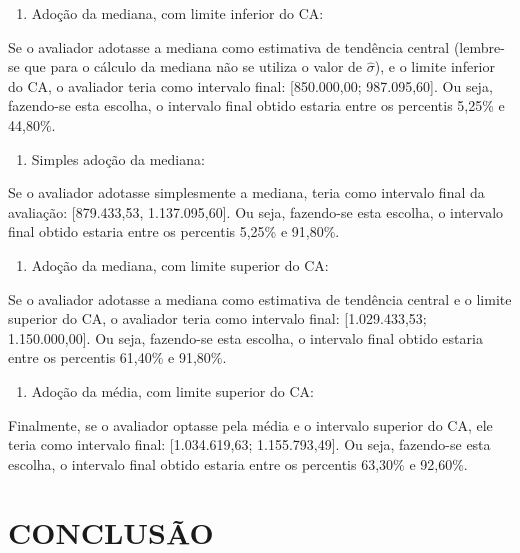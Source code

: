 \documentclass[a4paper, 12pt]{article}
\providecommand{\tightlist}{%
  \setlength{\itemsep}{0pt}\setlength{\parskip}{0pt}}
\begin{document}
\begin{enumerate}
\def\labelenumi{\arabic{enumi}.}
\setcounter{enumi}{1}
\tightlist
\item
  Adoção da mediana, com limite inferior do CA:
\end{enumerate}

Se o avaliador adotasse a mediana como estimativa de tendência central
(lembre-se que para o cálculo da mediana não se utiliza o valor de
\(\hat \sigma\)), e o limite inferior do CA, o avaliador teria como
intervalo final: {[}850.000,00; 987.095,60{]}. Ou seja, fazendo-se esta
escolha, o intervalo final obtido estaria entre os percentis 5,25\% e
44,80\%.

\begin{enumerate}
\def\labelenumi{\arabic{enumi}.}
\setcounter{enumi}{2}
\tightlist
\item
  Simples adoção da mediana:
\end{enumerate}

Se o avaliador adotasse simplesmente a mediana, teria como intervalo
final da avaliação: {[}879.433,53, 1.137.095,60{]}. Ou seja, fazendo-se
esta escolha, o intervalo final obtido estaria entre os percentis 5,25\%
e 91,80\%.

\begin{enumerate}
\def\labelenumi{\arabic{enumi}.}
\setcounter{enumi}{3}
\tightlist
\item
  Adoção da mediana, com limite superior do CA:
\end{enumerate}

Se o avaliador adotasse a mediana como estimativa de tendência central e
o limite superior do CA, o avaliador teria como intervalo final:
{[}1.029.433,53; 1.150.000,00{]}. Ou seja, fazendo-se esta escolha, o
intervalo final obtido estaria entre os percentis 61,40\% e 91,80\%.

\begin{enumerate}
\def\labelenumi{\arabic{enumi}.}
\setcounter{enumi}{4}
\tightlist
\item
  Adoção da média, com limite superior do CA:
\end{enumerate}

Finalmente, se o avaliador optasse pela média e o intervalo superior do
CA, ele teria como intervalo final: {[}1.034.619,63; 1.155.793,49{]}. Ou
seja, fazendo-se esta escolha, o intervalo final obtido estaria entre os
percentis 63,30\% e 92,60\%.

\hypertarget{conclusao}{%
\section{CONCLUSÃO}\label{conclusao}}
\end{document}
